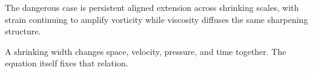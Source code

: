 The dangerous case is persistent aligned extension across shrinking scales, with strain continuing to amplify vorticity while viscosity diffuses the same sharpening structure.


A shrinking width changes space, velocity, pressure, and time together.
The equation itself fixes that relation.
